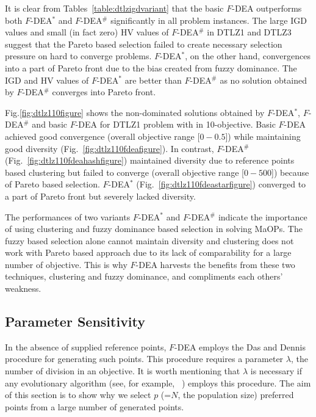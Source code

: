 \documentclass[review]{elsarticle}
\begin{document}
It is clear from Tables~\ref{table:dtlzigdvariant} that the basic $F$-DEA outperforms both $F$-DEA$^{*}$ and $F$-DEA$^{\#}$ significantly in all problem instances. 
The large IGD values and small (in fact zero) HV values of $F$-DEA$^{\#}$ in DTLZ1 and DTLZ3 suggest that the Pareto based selection failed to create necessary selection pressure on hard to converge problems. $F$-DEA$^{*}$, on the other hand, convergences into a part of Pareto front due to the bias created from fuzzy dominance. The IGD and HV values of $F$-DEA$^{*}$ are better than $F$-DEA$^{\#}$ as no solution obtained by $F$-DEA$^{\#}$ converges into Pareto front.

Fig.\ref{fig:dtlz110figure} shows the non-dominated solutions obtained by
$F$-DEA$^{*}$, $F$-DEA$^{\#}$ and  basic $F$-DEA for DTLZ1 problem with
in 10-objective. Basic $F$-DEA achieved good convergence (overall objective range [$0-0.5$]) while maintaining good diversity (Fig.~\ref{fig:dtlz110fdeafigure}). In contrast, $F$-DEA$^{\#}$ (Fig.~\ref{fig:dtlz110fdeahashfigure}) maintained diversity due to reference points based clustering but failed to converge (overall objective range [$0-500$]) because of Pareto based selection.
 $F$-DEA$^{*}$ (Fig.~\ref{fig:dtlz110fdeastarfigure}) converged to a part of Pareto front but severely lacked diversity. 

The performances of two variants $F$-DEA$^{*}$ and $F$-DEA$^{\#}$ indicate the importance of using clustering and fuzzy dominance based selection in solving MaOPs. The fuzzy based selection alone cannot maintain diversity and clustering does not work with Pareto based approach due to its lack of comparability for a large number of objective. This is why $F$-DEA harvests the benefits from these two techniques, clustering and fuzzy dominance, and compliments each others' weakness.




%
%



\subsection{Parameter Sensitivity}
\label{subsec:parametersensitvity}

In the absence of supplied reference points, $F$-DEA employs the Das and Dennis~\citep{das1998normal} procedure for generating such points. This procedure requires a parameter $\lambda$, the number of division in an objective. 
It is worth mentioning that  $\lambda$ is necessary if any evolutionary algorithm (see, for example, ~\citep{deb2014evolutionary}) employs this procedure. 
The aim of this section is to show why we select $p$ (=$N$, the population size) preferred points from a large number of generated points.
\end{document}
